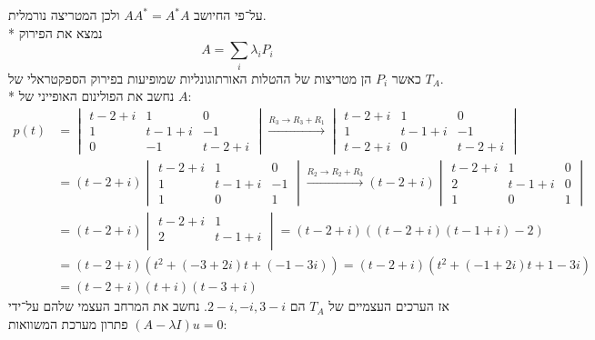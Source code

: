 על־פי החיושב $A A^* = A^* A$ ולכן המטריצה נורמלית. \\*
נמצא את הפירוק
\[
	A = \sum_{i} \lambda_i P_i
\]
כאשר $P_i$ הן מטריצות של ההטלות האורתוגונליות שמופיעות בפירוק הספקטראלי של $T_A$. \\*
נחשב את הפולינום האופייני של $A$:
\begin{align*}
	p(t) 
	& = 
	\begin{vmatrix}
		t - 2 + i & 1 & 0 \\
		1 & t - 1 + i & -1 \\
		0 & -1 & t - 2 + i
	\end{vmatrix}
	\xrightarrow{R_3 \to R_3 + R_1} 
	\begin{vmatrix}
		t - 2 + i & 1 & 0 \\
		1 & t - 1 + i & -1 \\
		t - 2 + i & 0 & t - 2 + i
	\end{vmatrix} \\
	& = 
	(t - 2 + i)
	\begin{vmatrix}
		t - 2 + i & 1 & 0 \\
		1 & t - 1 + i & -1 \\
		1 & 0 & 1
	\end{vmatrix}
	\xrightarrow{R_2 \to R_2 + R_3}
	(t - 2 + i)
	\begin{vmatrix}
		t - 2 + i & 1 & 0 \\
		2 & t - 1 + i & 0 \\
		1 & 0 & 1
	\end{vmatrix} \\
	& =
	(t - 2 + i)
	\begin{vmatrix}
		t - 2 + i & 1 \\
		2 & t - 1 + i \\
	\end{vmatrix}
	= (t - 2 + i) ((t - 2 + i) (t - 1 + i) - 2) \\
	& = (t - 2 + i)(t^2 + (-3 + 2i) t + (-1 - 3i))
	= (t - 2 + i)(t^2 + (-1 + 2i) t + 1 - 3i) \\
	& = (t - 2 + i)(t + i)(t - 3 + i)
\end{align*}
אז הערכים העצמיים של $T_A$ הם $2 - i, -i, 3 - i$. נחשב את המרחב העצמי שלהם על־ידי פתרון מערכת המשוואות $(A - \lambda I)u = 0$:
